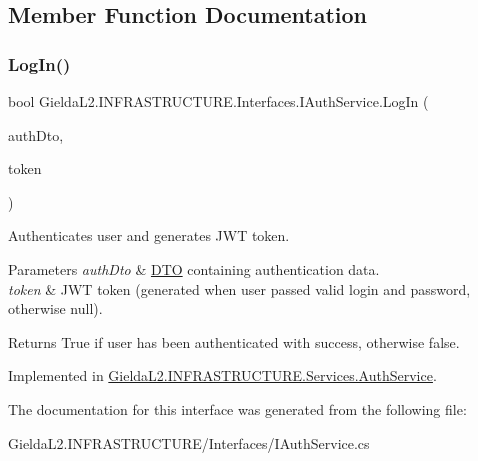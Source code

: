 \subsection{Member Function Documentation}
\mbox{\label{interface_gielda_l2_1_1_i_n_f_r_a_s_t_r_u_c_t_u_r_e_1_1_interfaces_1_1_i_auth_service_a9228c59864a95e038b513ee771f398bb}} 
\subsubsection{\texorpdfstring{LogIn()}{LogIn()}}
{\footnotesize\ttfamily bool Gielda\+L2.\+I\+N\+F\+R\+A\+S\+T\+R\+U\+C\+T\+U\+R\+E.\+Interfaces.\+I\+Auth\+Service.\+Log\+In (\begin{DoxyParamCaption}\item[{\mbox{\hyperlink{class_gielda_l2_1_1_i_n_f_r_a_s_t_r_u_c_t_u_r_e_1_1_d_t_o_1_1_auth_d_t_o}{Auth\+D\+TO}}}]{auth\+Dto,  }\item[{out string}]{token }\end{DoxyParamCaption})}



Authenticates user and generates J\+WT token. 


\begin{DoxyParams}{Parameters}
{\em auth\+Dto} & \mbox{\hyperlink{namespace_gielda_l2_1_1_i_n_f_r_a_s_t_r_u_c_t_u_r_e_1_1_d_t_o}{D\+TO}} containing authentication data.\\
\hline
{\em token} & J\+WT token (generated when user passed valid login and password, otherwise null).\\
\hline
\end{DoxyParams}
\begin{DoxyReturn}{Returns}
True if user has been authenticated with success, otherwise false.
\end{DoxyReturn}


Implemented in \mbox{\hyperlink{class_gielda_l2_1_1_i_n_f_r_a_s_t_r_u_c_t_u_r_e_1_1_services_1_1_auth_service_a11f0907fef09930d6533a6f6287d49ba}{Gielda\+L2.\+I\+N\+F\+R\+A\+S\+T\+R\+U\+C\+T\+U\+R\+E.\+Services.\+Auth\+Service}}.



The documentation for this interface was generated from the following file\+:\begin{DoxyCompactItemize}
\item 
Gielda\+L2.\+I\+N\+F\+R\+A\+S\+T\+R\+U\+C\+T\+U\+R\+E/\+Interfaces/I\+Auth\+Service.\+cs\end{DoxyCompactItemize}
